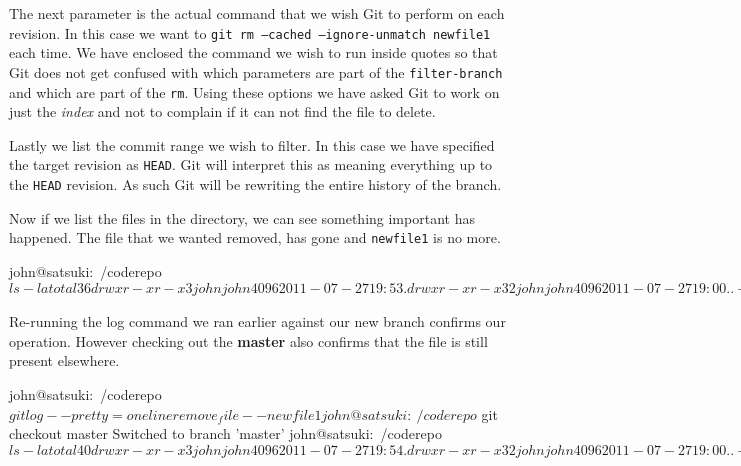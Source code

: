The next parameter is the actual command that we wish Git to perform on each revision.
In this case we want to \texttt{git rm --cached --ignore-unmatch newfile1} each time.
We have enclosed the command we wish to run inside quotes so that Git does not get confused with which parameters are part of the \texttt{filter-branch} and which are part of the \texttt{rm}.
Using these options we have asked Git to work on just the \emph{index} and not to complain if it can not find the file to delete.

Lastly we list the commit range we wish to filter.
In this case we have specified the target revision as \texttt{HEAD}.
Git will interpret this as meaning everything up to the \texttt{HEAD} revision.
As such Git will be rewriting the entire history of the branch.

Now if we list the files in the directory, we can see something important has happened.
The file that we wanted removed, has gone and \texttt{newfile1} is no more.

\begin{code}
john@satsuki:~/coderepo$ ls -la
total 36
drwxr-xr-x  3 john john 4096 2011-07-27 19:53 .
drwxr-xr-x 32 john john 4096 2011-07-27 19:00 ..
-rw-r--r--  1 john john   35 2011-07-22 07:15 another_file
-rw-r--r--  1 john john   25 2011-07-22 07:15 cont_dev
drwxrwxr-x  9 john john 4096 2011-07-27 19:53 .git
-rw-r--r--  1 john john   58 2011-07-22 07:15 newfile2
-rw-r--r--  1 john john   45 2011-07-22 07:15 newfile3
-rw-r--r--  1 john john    8 2011-03-31 22:15 temp_file
-rwxrwxr-x  1 john john  114 2011-07-21 21:17 test.sh
john@satsuki:~/coderepo$
\end{code}

Re-running the log command we ran earlier against our new branch confirms our operation.
However checking out the \textbf{master} also confirms that the file is still present elsewhere.

\begin{code}
john@satsuki:~/coderepo$ git log --pretty=oneline remove_file -- newfile1
john@satsuki:~/coderepo$ git checkout master
Switched to branch 'master'
john@satsuki:~/coderepo$ ls -la
total 40
drwxr-xr-x  3 john john 4096 2011-07-27 19:54 .
drwxr-xr-x 32 john john 4096 2011-07-27 19:00 ..
-rw-r--r--  1 john john   35 2011-07-22 07:15 another_file
-rw-r--r--  1 john john   25 2011-07-22 07:15 cont_dev
drwxrwxr-x  9 john john 4096 2011-07-27 19:54 .git
-rw-r--r--  1 john john   69 2011-07-27 19:54 newfile1
-rw-r--r--  1 john john   58 2011-07-22 07:15 newfile2
-rw-r--r--  1 john john   45 2011-07-22 07:15 newfile3
-rw-r--r--  1 john john    8 2011-03-31 22:15 temp_file
-rwxrwxr-x  1 john john  114 2011-07-21 21:17 test.sh
john@satsuki:~/coderepo$
\end{code}

